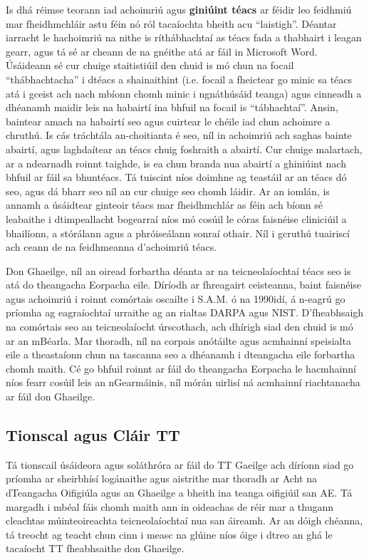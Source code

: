 \begin{multicols}{2}
Is dhá réimse teorann iad achoimriú agus \textbf{giniúint téacs} ar féidir leo feidhmiú mar fheidhmchláir astu féin nó ról tacaíochta bheith acu ``laistigh''. Déantar iarracht le hachoimriú na nithe is ríthábhachtaí as téacs fada a thabhairt i leagan gearr, agus tá sé ar cheann de na gnéithe atá ar fáil in Microsoft Word.  Úsáideann sé cur chuige staitistiúil den chuid is mó chun na focail ``thábhachtacha'' i dtéacs a shainaithint (i.e. focail a fheictear go minic sa téacs atá i gceist ach nach mbíonn chomh minic i ngnáthúsáid teanga) agus cinneadh a dhéanamh maidir leis na habairtí ina bhfuil na focail is ``tábhachtaí''. Ansin, baintear amach na habairtí seo agus cuirtear le chéile iad chun achoimre a chruthú. Is cás tráchtála an-choitianta é seo, níl in achoimriú ach saghas bainte abairtí, agus laghdaítear an téacs chuig foshraith a abairtí. Cur chuige malartach, ar a ndearnadh roinnt taighde, is ea chun branda nua abairtí a ghiniúint nach bhfuil ar fáil sa bhuntéacs. Tá tuiscint níos doimhne ag teastáil ar an téacs dó seo, agus dá bharr seo níl an cur chuige seo chomh láidir. Ar an iomlán, is annamh a úsáidtear ginteoir téacs mar fheidhmchlár as féin ach bíonn sé leabaithe i dtimpeallacht bogearraí níos mó cosúil le córas faisnéise cliniciúil a bhailíonn, a stórálann agus a phróiseálann sonraí othair.  Níl i gcruthú tuairiscí ach ceann de na feidhmeanna d’achoimriú téacs.  

Don Ghaeilge, níl an oiread forbartha déanta ar na teicneolaíochtaí téacs seo is atá do theangacha Eorpacha eile. Díríodh ar fhreagairt ceisteanna, baint faisnéise agus achoimriú i roinnt comórtais oscailte i S.A.M. ó na 1990idí, á n-eagrú go príomha ag eagraíochtaí urraithe ag an rialtas DARPA agus NIST. D’fheabhsaigh na comórtais seo an teicneolaíocht úrscothach, ach dhírigh siad den chuid is mó ar an mBéarla. Mar thoradh, níl na corpais anótáilte agus acmhainní speisialta eile a theastaíonn chun na tascanna seo a dhéanamh i dteangacha eile forbartha chomh maith. Cé go bhfuil roinnt ar fáil do theangacha Eorpacha le hacmhainní níos fearr cosúil leis an nGearmáinis, níl mórán uirlisí ná acmhainní riachtanacha ar fáil don Ghaeilge.

\subsection{Tionscal agus Cláir TT}

Tá tionscail úsáideora agus soláthróra ar fáil do TT Gaeilge ach díríonn siad go príomha ar sheirbhísí logánaithe agus aistrithe mar thoradh ar Acht na dTeangacha Oifigiúla agus an Ghaeilge a bheith ina teanga oifigiúil san AE. Tá margadh i mbéal fáis chomh maith ann in oideachas de réir mar a thugann cleachtas múinteoireachta teicneolaíochtaí nua san áireamh. Ar an dóigh chéanna, tá treocht ag teacht chun cinn i measc na glúine níos óige i dtreo an ghá le tacaíocht TT fheabhsaithe don Ghaeilge.


\end{multicols}
